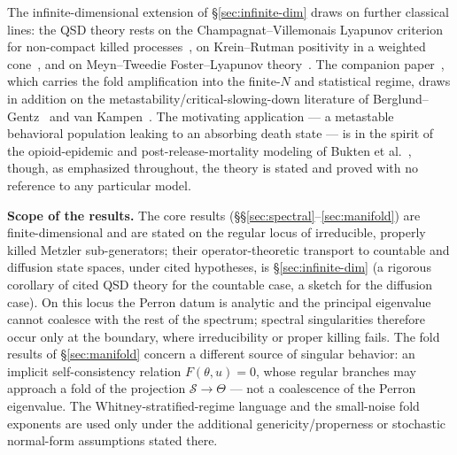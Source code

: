 \documentclass[11pt,reqno]{amsart}
\theoremstyle{plain}
\theoremstyle{definition}
\theoremstyle{remark}
\begin{document}
The infinite-dimensional extension of \S\ref{sec:infinite-dim} draws on
further classical lines: the QSD theory rests on the Champagnat--Villemonais Lyapunov
criterion for non-compact killed processes~\cite{ChampagnatVillemonais2016,%
ChampagnatVillemonais2017}, on Krein--Rutman positivity in a weighted
cone~\cite{KreinRutman1948}, and on Meyn--Tweedie Foster--Lyapunov
theory~\cite{MeynTweedie2009}. The companion paper~\cite{SarkarFoldSensing}, which
carries the fold amplification into the finite-$N$ and statistical regime, draws in
addition on the metastability/critical-slowing-down literature of
Berglund--Gentz~\cite{BerglundGentz2006} and van Kampen~\cite{vanKampen2007}. The motivating application --- a metastable
behavioral population leaking to an absorbing death state --- is in the spirit of
the opioid-epidemic and post-release-mortality modeling of
Bukten et al.~\cite{Bukten2017}, though, as
emphasized throughout, the theory is stated and proved with no reference to any
particular model.

\smallskip
\noindent\textbf{Scope of the results.}
The core results (\S\S\ref{sec:spectral}--\ref{sec:manifold}) are finite-dimensional and are stated on
the regular locus of irreducible, properly killed Metzler sub-generators; their operator-theoretic
transport to countable and diffusion state spaces, under cited hypotheses, is \S\ref{sec:infinite-dim}
(a rigorous corollary of cited QSD theory for the countable case, a sketch for the diffusion case). On
this locus the Perron datum is analytic and the principal eigenvalue cannot coalesce with the rest of
the spectrum; spectral singularities therefore occur only at the boundary, where
irreducibility or proper killing fails. The fold results of \S\ref{sec:manifold}
concern a different source of singular behavior: an implicit self-consistency
relation $F(\theta,u)=0$, whose regular branches may approach a fold of the
projection $\mathcal S\to\Theta$ --- not a coalescence of the Perron eigenvalue. The
Whitney-stratified-regime language and the small-noise fold exponents are used only
under the additional genericity/properness or stochastic normal-form assumptions
stated there.
\end{document}
